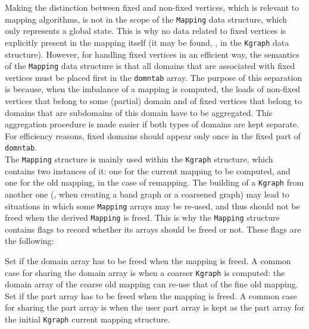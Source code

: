 Making the distinction between fixed and non-fixed vertices, which is
relevant to mapping algorithms, is not in the scope of the
\texttt{Mapping} data structure, which only represents a global
state. This is why no data related to fixed vertices is explicitly
present in the mapping itself (it may be found, \eg, in the
\texttt{Kgraph} data structure).
However, for handling fixed vertices in an efficient way, the
semantics of the \texttt{Mapping} data structure is that all domains
that are associated with fixed vertices must be placed first in the
\texttt{domntab} array. The purpose of this separation is because,
when the imbalance of a mapping is computed, the loads of non-fixed
vertices that belong to some (partial) domain and of fixed vertices
that belong to domains that are subdomains of this domain have to be
aggregated. This aggregation procedure is made easier if both types of
domains are kept separate. For efficiency reasons, fixed domains
should appear only once in the fixed part of \texttt{domntab}.
\\

The \texttt{Mapping} structure is mainly used within the
\texttt{Kgraph} structure, which contains two instances of it: one for
the current mapping to be computed, and one for the old mapping, in
the case of remapping. The building of a \texttt{Kgraph} from another
one (\eg, when creating a band graph or a coarsened graph) may lead to
situations in which some \texttt{Mapping} arrays may be re-used, and
thus should not be freed when the derived \texttt{Mapping} is
freed. This is why the \texttt{Mapping} structure contains flags to
record whether its arrays should be freed or not. These flags are the
following:
\begin{itemize}
  Set if the domain array has to be freed when the mapping is freed. A
  common case for sharing the domain array is when a coarser
  \texttt{Kgraph} is computed: the domain array of the coarse old
  mapping can re-use that of the fine old mapping.
  Set if the part array has to be freed when the mapping is freed. A
  common case for sharing the part array is when the user part array
  is kept as the part array for the initial \texttt{Kgraph} current
  mapping structure.
\end{itemize}

